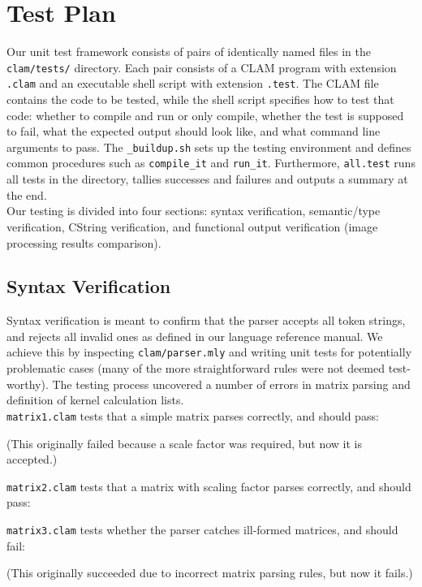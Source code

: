 \chapter{Test Plan}
\label{chap:testplan}

Our unit test framework consists of pairs of identically named files in the \texttt{clam/tests/} directory.
Each pair consists of a CLAM program with extension \texttt{.clam} and an executable shell script
with extension \texttt{.test}. The CLAM file contains the code to be tested, while the shell script
specifies how to test that code: whether to compile and run or only compile, whether the test is supposed to fail,
what the expected output should look like, and what command line arguments to pass.
The \texttt{_buildup.sh} sets up the testing environment and defines common procedures such as
\texttt{compile_it} and \texttt{run_it}. Furthermore, \texttt{all.test} runs all tests in the directory,
tallies successes and failures and outputs a summary at the end.\\

Our testing is divided into four sections: syntax verification, semantic/type verification, CString verification, and functional output verification (image processing results comparison). 

\section{Syntax Verification}
\label{testing:syntax}

Syntax verification is meant to confirm that the parser accepts all token strings,
and rejects all invalid ones as defined in our language reference manual.
We achieve this by inspecting \texttt{clam/parser.mly} and writing unit tests for
potentially problematic cases (many of the more straightforward rules were not deemed test-worthy).
The testing process uncovered a number of errors
in matrix parsing and definition of kernel calculation lists.\\

\texttt{matrix1.clam} tests that a simple matrix parses correctly, and should pass:

(This originally failed because a scale factor was required, but now it is accepted.)

\texttt{matrix2.clam} tests that a matrix with scaling factor parses correctly, and should pass:


\texttt{matrix3.clam} tests whether the parser catches ill-formed matrices, and should fail:

(This originally succeeded due to incorrect matrix parsing rules, but now it fails.)

